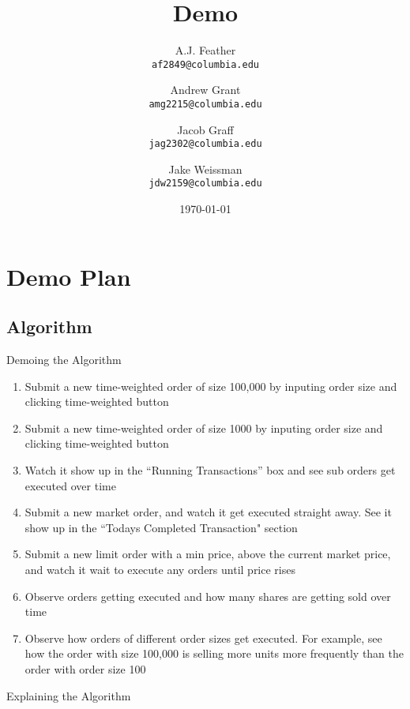 \documentclass{article}
\title{Demo}
\author{
    A.J. Feather\\
    \texttt{af2849@columbia.edu}
    \and
    Andrew Grant\\
    \texttt{amg2215@columbia.edu}
    \and
    Jacob Graff\\
    \texttt{jag2302@columbia.edu}
    \and
    Jake Weissman\\
    \texttt{jdw2159@columbia.edu}
}
\date{\today}
\begin{document}
\maketitle

\section{Demo Plan}

\subsection{Algorithm}
Demoing the Algorithm
\begin{enumerate}
\item Submit a new time-weighted order of size 100,000 by inputing order size and clicking time-weighted button
\item Submit a new time-weighted order of size 1000 by inputing order size and clicking time-weighted button
\item Watch it show up in the ``Running Transactions'' box and see sub orders get executed over time
\item Submit a new market order, and watch it get executed straight away. See it show up in the ``Todays Completed Transaction" section
\item Submit a new limit order with a min price, above the current market price, and watch it wait to execute any orders until price rises
\item Observe orders getting executed and how many shares are getting sold over time
\item Observe how orders of different order sizes get executed. For example, see how the order with size 100,000 is selling more units more frequently than the order with order size 100
\end{enumerate}
Explaining the Algorithm
\end{document}
